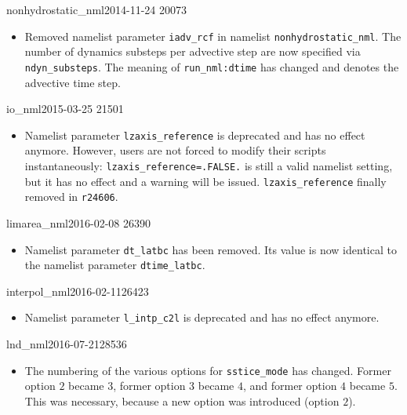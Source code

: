 \begin{changeitem}{nonhydrostatic\_nml}{2014-11-24 }{20073}
  \begin{itemize}
   \item Removed namelist parameter \texttt{iadv\_rcf} in namelist
         \texttt{nonhydrostatic\_nml}. The number of dynamics substeps per advective step are now specified 
         via \texttt{ndyn\_substeps}. 
         The meaning of \texttt{run\_nml:dtime} has changed and denotes the advective time step.
  \end{itemize}
\end{changeitem}

\begin{changeitem}{io\_nml}{2015-03-25 }{21501}
  \begin{itemize}
   \item Namelist parameter \texttt{lzaxis\_reference} is deprecated and has no effect anymore.
         However, users are not forced to modify their scripts instantaneously: \texttt{lzaxis\_reference=.FALSE.} 
         is still a valid namelist setting, but it has no effect and a warning will be issued. 
         \texttt{lzaxis\_reference} finally removed in \texttt{r24606}.
  \end{itemize}
\end{changeitem}

\begin{changeitem}{limarea\_nml}{2016-02-08 }{26390}
  \begin{itemize}
   \item Namelist parameter \texttt{dt\_latbc} has been removed. Its value is now
         identical to the namelist parameter \texttt{dtime\_latbc}.
  \end{itemize}
\end{changeitem}

\begin{changeitem}{interpol\_nml}{2016-02-11}{26423}
  \begin{itemize}
   \item Namelist parameter \texttt{l\_intp\_c2l} is deprecated and has no effect anymore.
  \end{itemize}
\end{changeitem}

\begin{changeitem}{lnd\_nml}{2016-07-21}{28536}
  \begin{itemize}
   \item The numbering of the various options for \texttt{sstice\_mode} has changed. Former option $2$ became $3$, 
   former option $3$ became $4$, and former option $4$ became $5$. This was necessary, because a new option was introduced (option $2$).
  \end{itemize}
\end{changeitem}

